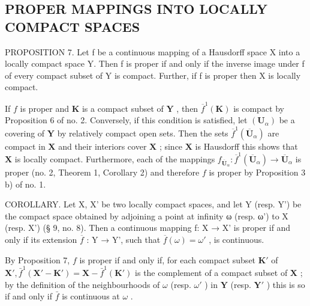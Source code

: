 \subsection{PROPER MAPPINGS INTO LOCALLY COMPACT SPACES}

PROPOSITION 7. Let f be a continuous mapping of a Hausdorff space X into a locally compact space Y. Then f is proper if and only if the inverse image under f of every compact subset of Y is compact. Further, if f is proper then X is locally compact.

If \(f\) is proper and \(\mathbf{K}\) is a compact subset of \(\mathbf{Y}\) , then \(\overline{f}^{1}(\mathbf{K})\) is compact by Proposition 6 of no. 2. Conversely, if this condition is satisfied, let \((\mathbf{U}_{\alpha})\) be a covering of \(\mathbf{Y}\) by relatively compact open sets. Then the sets \(\overline{f}^{1}(\overline{\mathbf{U}}_{\alpha})\) are compact in \(\mathbf{X}\) and their interiors cover \(\mathbf{X}\) ; since \(\mathbf{X}\) is Hausdorff this shows that \(\mathbf{X}\) is locally compact. Furthermore, each of the mappings \(f_{\overline{\mathbf{U}}_{\alpha}}: \overline{f}^{1}(\overline{\mathbf{U}}_{\alpha}) \to \overline{\mathbf{U}}_{\alpha}\) is proper (no. 2, Theorem 1, Corollary 2) and therefore \(f\) is proper by Proposition 3 b) of no. 1.

COROLLARY. Let X, X' be two locally compact spaces, and let Y (resp. Y') be the compact space obtained by adjoining a point at infinity ω (resp. ω') to X (resp. X') (§ 9, no. 8). Then a continuous mapping f: X → X' is proper if and only if its extension \(\overline{f}\) : Y → Y', such that \(\overline{f}(\omega) = \omega'\) , is continuous.

By Proposition 7, \(f\) is proper if and only if, for each compact subset \(\mathbf{K}'\) of \(\mathbf{X}', \bar{f}^1(\mathbf{X}' - \mathbf{K}') = \mathbf{X} - \bar{f}^1(\mathbf{K}')\) is the complement of a compact subset of \(\mathbf{X}\) ; by the definition of the neighbourhoods of \(\omega\) (resp. \(\omega'\) ) in \(\mathbf{Y}\) (resp. \(\mathbf{Y}'\) ) this is so if and only if \(\bar{f}\) is continuous at \(\omega\) .

